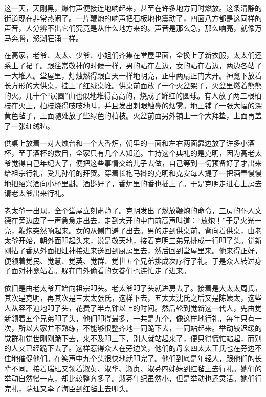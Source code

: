 \par 这一天，天刚黑，爆竹声便接连地响起来，甚至在许多地方同时燃放。这条清静的街道现在非常热闹了。一片鞭炮的响声把石板地也震动了，四面八方都是这同样的声音，人分辨不出它们究竟是从什么地方来的。声音是那么急，那么响亮，就像万马奔腾，怒潮狂涌一样。
\par 在高家，老爷、太太、少爷、小姐们齐集在堂屋里面，全换上了新衣服，太太们还系上了裙子。跟往常敬神的时候一样，男的站在左边，女的站在右边，两边各站了一大堆人。堂屋里，灯烛燃得跟白天一样地明亮，正中两扇正门大开。神龛下放着长方形的大供桌，挂上了红绒桌帷。供桌前面放了一个火盆架子，火盆里燃着熊熊的火。几十个“炭圆”山也似地堆得高高的，烧成了鲜红的圆球。有人放了两三根柏枝在火上，柏枝烧得吱吱地叫，并且发出刺眼触鼻的烟雾。地上铺了一张大幅的深黄色毡子，上面随处放了些绿色的柏枝。火盆前面另外铺上一个大拜垫，上面再盖了一张红绒毡。
\par 供桌上放着一对大烛台和一个大香炉，朝里的一面和左右两面靠边放了许多小酒杯，至于酒杯的数目，全家只有几个人知道。主持这个典礼的是克明，因为高老太爷觉得自己年纪大了，便把这些事情交给儿子去做，自己等到一切预备好了才出来给祖宗行礼，受儿孙们的拜贺。穿着长袍马褂的克明和克安每人提了一把酒壶慢慢地把绍兴酒向小杯里斟。酒斟好了，香炉里的香也插上了。于是克明走进右上房去请老太爷出来行礼。
\par 老太爷一出现，全个堂屋立刻肃静了。克明发出了燃放鞭炮的命令，三房的仆人文德在旁边应了一声急急走出去，走到大开的中门前高声叫道：“放炮！”于是火光一亮，鞭炮突然响起来。女的从侧门避了出去。男的走到供桌前，背向着供桌，由老太爷开始，朝外面叩起头来，说是敬天地，接着克明三弟兄排成一行叩了头。觉新刚拈了香从外面把灶神接进来送回到厨房里去，然后回到堂屋里来。他来得正好，便领着觉民、觉慧、觉英、觉群、觉世五个兄弟排成次序行了礼。于是众人转过身子面对神龛站着。躲在门外偷看的女眷们也连忙走了进来。
\par 依旧是由老太爷开始向祖宗叩头。老太爷叩了头就进房去了。接着是大太太周氏，其次是克明，再其次是三太太张氏，这样下去，五太太沈氏之后又是陈姨太，这些人从容不迫地叩了头，花费了半点钟以上的时间。然后轮到觉新这一代人，先由觉新领着五个兄弟叩了头，他们叩得最多，一共是九个，像这样地行礼，每年只有一次，所以大家并不熟练，不能够很整齐地一同跪下去，一同站起来。举动较迟缓的觉群和觉世刚刚跪下去，来不及叩三下，别人就站起来了，便只得慌忙站起，而别的人又已经跪下去了。这样惹得众人在旁边笑，他们的母亲四太太王氏也在旁边不住地催促他们。在笑声中九个头很快地就叩完了。他们到底是年轻人，跟他们的长辈不同。接着瑞珏又领着淑英、淑华、淑贞、淑芬四姊妹到红毡上去行礼。她们的举动自然慢一点，却比较整齐多了。淑芬年纪虽然小，但是举动也还灵活。她们行完礼，瑞珏又牵了海臣到红毡上去叩头。
